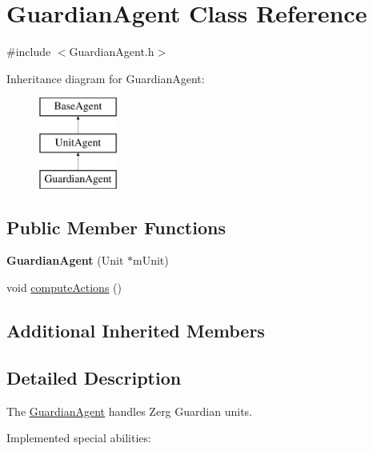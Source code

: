 \hypertarget{class_guardian_agent}{\section{Guardian\-Agent Class Reference}
\label{class_guardian_agent}
}


{\ttfamily \#include $<$Guardian\-Agent.\-h$>$}

Inheritance diagram for Guardian\-Agent\-:\begin{figure}[H]
\begin{center}
\leavevmode
\includegraphics[height=3.000000cm]{class_guardian_agent}
\end{center}
\end{figure}
\subsection*{Public Member Functions}
\begin{DoxyCompactItemize}
\item 
\hypertarget{class_guardian_agent_abe0480ed38095f349cb4ca687e5ef009}{{\bfseries Guardian\-Agent} (Unit $\ast$m\-Unit)}\label{class_guardian_agent_abe0480ed38095f349cb4ca687e5ef009}

\item 
void \hyperlink{class_guardian_agent_ae25d3e3d17a76bc842e4a58c28d924a7}{compute\-Actions} ()
\end{DoxyCompactItemize}
\subsection*{Additional Inherited Members}


\subsection{Detailed Description}
The \hyperlink{class_guardian_agent}{Guardian\-Agent} handles Zerg Guardian units.

Implemented special abilities\-:
\begin{DoxyItemize}
\item 
\end{DoxyItemize}

